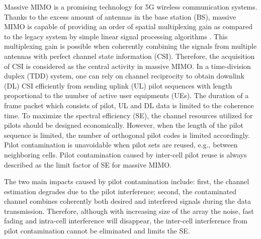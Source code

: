 Massive MIMO is a promising technology for %
5G wireless communication systems. Thanks to the excess amount of antennas in the base station (BS), massive MIMO is capable of providing an order of spatial multiplexing gain as compared to the legacy system by simple linear signal processing algorithms \cite{marzetta2010noncooperative}. 
This multiplexing gain is %
possible when coherently combining the signals from multiple antennas with perfect channel state information (CSI). Therefore, the acquisition of CSI is considered as the central activity in massive MIMO. In a time-division duplex (TDD) system, one can rely on channel reciprocity to obtain downlink (DL) CSI efficiently from sending uplink (UL) pilot sequences with %
length proportional to the number of active user equipments (UEs). %
The duration of a frame packet which consists of pilot, UL and DL data is %
limited to the coherence time. To maximize the spectral efficiency (SE), the channel resources utilized for pilots should be designed economically. However, when the length of the pilot sequence is limited, the number of orthogonal pilot codes is limited accordingly. Pilot contamination is unavoidable when pilot sets are reused, e.g., between neighboring cells. %
Pilot contamination caused by inter-cell pilot reuse is always described as the limit factor of SE for massive MIMO\cite{marzetta2010noncooperative,jose2011pilot}. 

The two main impacts caused by pilot contamination include: first, the channel estimation degrades due to the pilot interference; second, the contaminated channel combines coherently both desired and interfered signals during the data transmission. Therefore, although with increasing size of the array the %
noise, fast fading and intra-cell interference will disappear, %
the inter-cell interference from pilot contamination cannot be eliminated and limits the SE\cite{marzetta2010noncooperative,bjornson2017massive}. 

